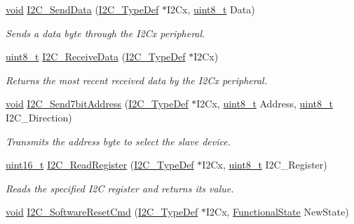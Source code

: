 \begin{DoxyCompactItemize}
\hyperlink{usb__devapi_8h_afabf60e7f57651d6d595a02c75f07cd0}{void} \hyperlink{group___i2_c___exported___functions_ga7bd9e70b8eafde0dd5eb42b0d95fe1a9}{I2\+C\+\_\+\+Send\+Data} (\hyperlink{struct_i2_c___type_def}{I2\+C\+\_\+\+Type\+Def} $\ast$I2\+Cx, \hyperlink{_p_e___types_8h_aba7bc1797add20fe3efdf37ced1182c5}{uint8\+\_\+t} Data)
\begin{DoxyCompactList}\small\item\em Sends a data byte through the I2\+Cx peripheral. \end{DoxyCompactList}\item 
\hyperlink{_p_e___types_8h_aba7bc1797add20fe3efdf37ced1182c5}{uint8\+\_\+t} \hyperlink{group___i2_c___exported___functions_gaeaaa4b6f77f50eb57465148c55d27fb2}{I2\+C\+\_\+\+Receive\+Data} (\hyperlink{struct_i2_c___type_def}{I2\+C\+\_\+\+Type\+Def} $\ast$I2\+Cx)
\begin{DoxyCompactList}\small\item\em Returns the most recent received data by the I2\+Cx peripheral. \end{DoxyCompactList}\item 
\hyperlink{usb__devapi_8h_afabf60e7f57651d6d595a02c75f07cd0}{void} \hyperlink{group___i2_c___exported___functions_ga009fc2a5b2313c36da39ece39a1156a6}{I2\+C\+\_\+\+Send7bit\+Address} (\hyperlink{struct_i2_c___type_def}{I2\+C\+\_\+\+Type\+Def} $\ast$I2\+Cx, \hyperlink{_p_e___types_8h_aba7bc1797add20fe3efdf37ced1182c5}{uint8\+\_\+t} Address, \hyperlink{_p_e___types_8h_aba7bc1797add20fe3efdf37ced1182c5}{uint8\+\_\+t} I2\+C\+\_\+\+Direction)
\begin{DoxyCompactList}\small\item\em Transmits the address byte to select the slave device. \end{DoxyCompactList}\item 
\hyperlink{_p_e___types_8h_a1f1825b69244eb3ad2c7165ddc99c956}{uint16\+\_\+t} \hyperlink{group___i2_c___exported___functions_ga8021dc796d15f997356b0583d6346805}{I2\+C\+\_\+\+Read\+Register} (\hyperlink{struct_i2_c___type_def}{I2\+C\+\_\+\+Type\+Def} $\ast$I2\+Cx, \hyperlink{_p_e___types_8h_aba7bc1797add20fe3efdf37ced1182c5}{uint8\+\_\+t} I2\+C\+\_\+\+Register)
\begin{DoxyCompactList}\small\item\em Reads the specified I2C register and returns its value. \end{DoxyCompactList}\item 
\hyperlink{usb__devapi_8h_afabf60e7f57651d6d595a02c75f07cd0}{void} \hyperlink{group___i2_c___exported___functions_ga1289c908aeb882443aba323b459c638b}{I2\+C\+\_\+\+Software\+Reset\+Cmd} (\hyperlink{struct_i2_c___type_def}{I2\+C\+\_\+\+Type\+Def} $\ast$I2\+Cx, \hyperlink{agilefox_2library_2inc_2stm32f10x__type_8h_ac9a7e9a35d2513ec15c3b537aaa4fba1}{Functional\+State} New\+State)

\end{DoxyCompactItemize}
